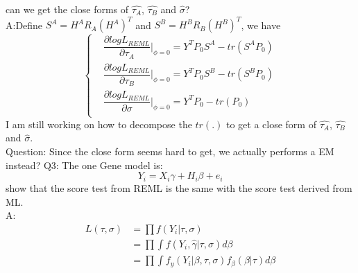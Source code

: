 \documentclass[12pt]{article}
\begin{document}
    can we get the close forms of $\hat{\tau_A}$, $\hat{\tau_B}$ and $\hat{\sigma}$?\\
    A:Define $S^A=H^AR_A(H^A)^T$ and $S^B=H^BR_B(H^B)^T$, we have
    \begin{equation*}
        \left\{
        \begin{aligned}
            &\dfrac{\partial log L_{REML}}{\partial \tau_A}|_{\phi=0}=Y^TP_0S^A-tr(S^AP_0)\\
            &\dfrac{\partial log L_{REML}}{\partial \tau_B}|_{\phi=0}=Y^TP_0S^B-tr(S^BP_0)\\
            &\dfrac{\partial log L_{REML}}{\partial \sigma}|_{\phi=0}=Y^TP_0-tr(P_0)\\
        \end{aligned}
        \right.
    \end{equation*}
    I am still working on how to decompose the $tr(.)$ to get a close form of $\hat{\tau_A}$, $\hat{\tau_B}$ and $\hat{\sigma}$.\\
    Question: Since the close form seems hard to get, we actually performs a EM instead?
    Q3: The one Gene model is:
    \begin{equation*}
        Y_i=X_i\gamma+H_i\beta+e_i
    \end{equation*}
    show that the score test from REML is the same with the score test derived from ML.\\
    A:
    \begin{equation*}
    \begin{split}
        L(\tau,\sigma)&=\prod f(Y_i|\tau,\sigma)\\
        &=\prod\int f(Y_i,\hat{\gamma}|\tau,\sigma)d\beta\\
        &=\prod\int f_y(Y_i|\beta,\tau,\sigma)f_{\beta}(\beta|\tau)d\beta\\
    \end{split}
    \end{equation*}
\end{document}
